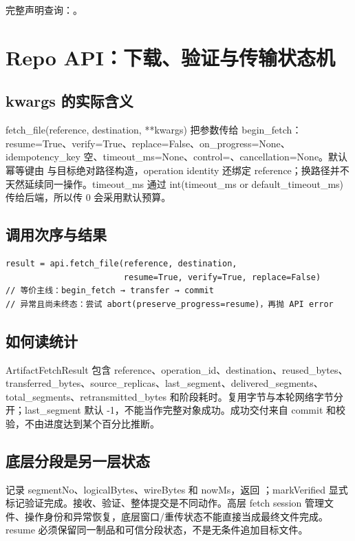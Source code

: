 完整声明查询：。

\section{Repo API：下载、验证与传输状态机}

\subsection{kwargs 的实际含义}
fetch\_file(reference, destination, **kwargs) 把参数传给 begin\_fetch：resume=True、verify=True、replace=False、on\_progress=None、idempotency\_key 空、timeout\_ms=None、control=、cancellation=None。默认幂等键由  与目标绝对路径构造，operation identity 还绑定 reference；换路径并不天然延续同一操作。timeout\_ms 通过 int(timeout\_ms or default\_timeout\_ms) 传给后端，所以传 0 会采用默认预算。

\subsection{调用次序与结果}

\begin{Verbatim}[fontsize=\footnotesize,breaklines,breakanywhere]
result = api.fetch_file(reference, destination,
                        resume=True, verify=True, replace=False)
// 等价主线：begin_fetch → transfer → commit
// 异常且尚未终态：尝试 abort(preserve_progress=resume)，再抛 API error
\end{Verbatim}

\subsection{如何读统计}
ArtifactFetchResult 包含 reference、operation\_id、destination、reused\_bytes、transferred\_bytes、source\_replicas、last\_segment、delivered\_segments、total\_segments、retransmitted\_bytes 和阶段耗时。复用字节与本轮网络字节分开；last\_segment 默认 -1，不能当作完整对象成功。成功交付来自 commit 和校验，不由进度达到某个百分比推断。

\subsection{底层分段是另一层状态}
 记录 segmentNo、logicalBytes、wireBytes 和 nowMs，返回 ；markVerified 显式标记验证完成。接收、验证、整体提交是不同动作。高层 fetch session 管理文件、操作身份和异常恢复，底层窗口/重传状态不能直接当成最终文件完成。resume 必须保留同一制品和可信分段状态，不是无条件追加目标文件。

